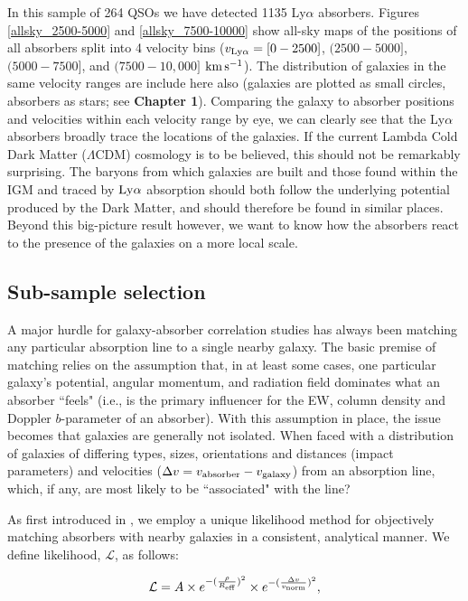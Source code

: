 \documentclass[twocolumn,tighten]{aastex62}
\newcommand{\kms}{$\rm km\, s^{-1}$}
\begin{document}
In this sample of 264 QSOs we have detected 1135 Ly$\alpha$ absorbers. Figures \ref{allsky_2500-5000} and \ref{allsky_7500-10000} show all-sky maps of the positions of all absorbers split into 4 velocity bins ($v_{\rm Ly\alpha} = [0 - 2500]$, $(2500 - 5000]$, $(5000 - 7500]$, and $(7500 - 10,000]$ \kms). The distribution of galaxies in the same velocity ranges are include here also (galaxies are plotted as small circles, absorbers as stars; see \textbf{Chapter 1}). Comparing the galaxy to absorber positions and velocities within each velocity range by eye, we can clearly see that the Ly$\alpha$ absorbers broadly trace the locations of the galaxies. If the current Lambda Cold Dark Matter ($\Lambda$CDM) cosmology is to be believed, this should not be remarkably surprising. The baryons from which galaxies are built and those found within the IGM and traced by $\rm Ly\alpha$ absorption should both follow the underlying potential produced by the Dark Matter, and should therefore be found in similar places. Beyond this big-picture result however, we want to know how the absorbers react to the presence of the galaxies on a more local scale.


\subsection{Sub-sample selection}
A major hurdle for galaxy-absorber correlation studies has always been matching any particular absorption line to a single nearby galaxy. The basic premise of matching relies on the assumption that, in at least some cases, one particular galaxy's potential, angular momentum, and radiation field dominates what an absorber ``feels" (i.e., is the primary influencer for the EW, column density and Doppler $b$-parameter of an absorber). With this assumption in place, the issue becomes that galaxies are generally not isolated. When faced with a distribution of galaxies of differing types, sizes, orientations and distances (impact parameters) and velocities ($\Delta v = v_{\rm absorber} - v_{\rm galaxy}$) from an absorption line, which, if any, are most likely to be ``associated" with the line? 

As first introduced in \cite{french2017}, we employ a unique likelihood method for objectively matching absorbers with nearby galaxies in a consistent, analytical manner. We define likelihood, $\mathcal{L}$, as follows: 

\begin{equation}
\mathcal{L} = A \times e^{-(\frac{\rho}{R_{\rm eff}})^2} \times e^{-(\frac{\Delta v}{v_{\rm norm}})^2},
\label{likelihood}
\end{equation}
\end{document}
